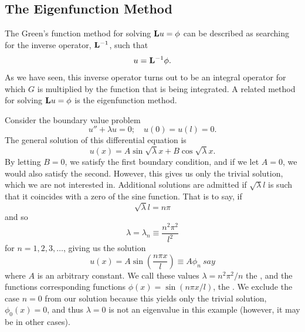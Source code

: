 \subsection{The Eigenfunction Method}
The Green's function method for solving \(\mathrm{\bf{L}} u = \phi\) can be described as searching for the inverse operator, 
\(\mathrm{\bf{L}}^{-1}\), such that
\begin{equation*}
    u = \mathrm{\bf{L}}^{-1} \phi.
\end{equation*}
As we have seen, this inverse operator turns out to be an integral operator for which \(G\) is multiplied by the function that is being integrated. A related method for solving \(\mathrm{\bf{L}} u = \phi\) is the eigenfunction method.

Consider the boundary value problem
\begin{equation}\label{eq:eigSL}
    u'' + \lambda u = 0;\quad u(0) = u(l) = 0.
\end{equation}
The general solution of this differential equation is
\begin{equation*}
    u(x) = A\sin\sqrt{\lambda}x+ B\cos\sqrt{\lambda}x.
\end{equation*}
By letting \(B=0\), we satisfy the first boundary condition, and if we let \(A=0\), we would also satisfy the second. However, this gives us only the trivial solution, which we are not interested in. Additional solutions are admitted if \(\sqrt{\lambda}l\) is such that it coincides with a zero of the sine function. That is to say, if
\begin{equation*}
    \sqrt{\lambda}l = n\pi
\end{equation*}
and so
\begin{equation*}
    \lambda = \lambda_n \equiv \frac{n^2\pi^2}{l^2} 
\end{equation*}
for \(n= 1,2,3, \dots\), giving us the solution
\begin{equation*}
    u(x) = A\sin (\frac{n\pi x}{l}) \equiv A\phi_n\ say
\end{equation*}
where \(A\) is an arbitrary constant. We call these values \(\lambda = n^2\pi^2/n\) the , and the functions corresponding functions \(\phi(x) = \sin (n\pi x/l)\), the . We exclude the case \(n=0\) from our solution because this yields only the trivial solution, \(\phi_0(x)=0\), and thus \(\lambda = 0\) is not an eigenvalue in this example (however, it may be in other cases).  

